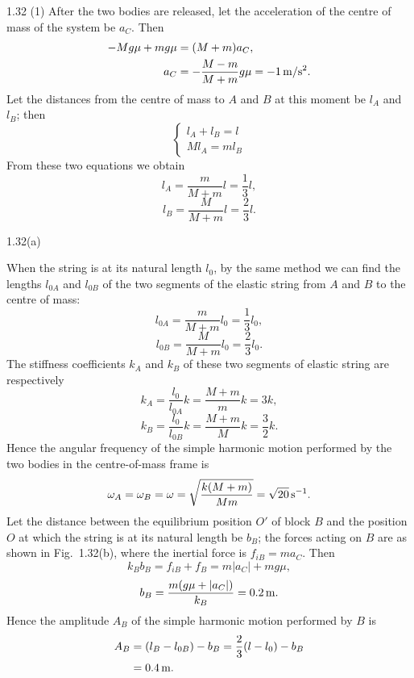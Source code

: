 \begin{solution}{1.32}
(1) After the two bodies are released, let the acceleration of the centre of mass of the system be $a_C$. Then
\begin{align*}
-Mg\mu+mg\mu&=(M+m)a_C,\\
a_C&=-\frac{M-m}{M+m}g\mu=-1\,\mathrm{m/s^2}.
\end{align*}
Let the distances from the centre of mass to $A$ and $B$ at this moment be $l_A$ and $l_B$; then
\[
\begin{cases}
l_A+l_B=l\\
Ml_A=ml_B
\end{cases}
\]
From these two equations we obtain
\[
l_A=\frac{m}{M+m}l=\frac{1}{3}l,
\]
\[
l_B=\frac{M}{M+m}l=\frac{2}{3}l.
\]

\begin{figbox}{1.32(a)}
\end{figbox}

When the string is at its natural length $l_0$, by the same method we can find the lengths $l_{0A}$ and $l_{0B}$ of the two segments of the elastic string from $A$ and $B$ to the centre of mass:
\[
l_{0A}=\frac{m}{M+m}l_0=\frac{1}{3}l_0,
\]
\[
l_{0B}=\frac{M}{M+m}l_0=\frac{2}{3}l_0.
\]
The stiffness coefficients $k_A$ and $k_B$ of these two segments of elastic string are respectively
\[
k_A=\frac{l_0}{l_{0A}}k=\frac{M+m}{m}k=3k,
\]
\[
k_B=\frac{l_0}{l_{0B}}k=\frac{M+m}{M}k=\frac{3}{2}k.
\]
Hence the angular frequency of the simple harmonic motion performed by the two bodies in the centre-of-mass frame is
\[
\omega_A=\omega_B=\omega=\sqrt{\frac{k(M+m)}{Mm}}=\sqrt{20}\,\mathrm{s^{-1}}.
\]
Let the distance between the equilibrium position $O'$ of block $B$ and the position $O$ at which the string is at its natural length be $b_B$; the forces acting on $B$ are as shown in Fig.~1.32(b), where the inertial force is $f_{iB}=ma_C$. Then
\[
k_Bb_B=f_{iB}+f_B=m|a_C|+mg\mu,
\]
\[
b_B=\frac{m(g\mu+|a_C|)}{k_B}=0.2\,\mathrm{m}.
\]
Hence the amplitude $A_B$ of the simple harmonic motion performed by $B$ is
\begin{align*}
A_B&=(l_B-l_{0B})-b_B=\frac{2}{3}(l-l_0)-b_B\\
&=0.4\,\mathrm{m}.
\end{align*}


\end{solution}
